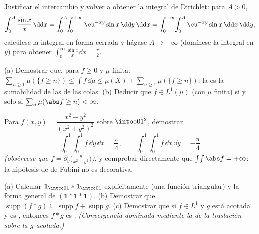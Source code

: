 \begin{exercise}[$\star$]\label{exo:b3:product:2}
Justificar el intercambio y volver a obtener la integral de Dirichlet:
para
$A > 0$,
\[
\int_0^A\frac{\sin x}x\,\dd x
= \int_0^A\!\!\int_0^{+\infty}\eu^{-xy}\sin x\,\dd y\,\dd x
= \int_0^{+\infty}\!\!\int_0^A \eu^{-xy}\sin x\,\dd x\,\dd y,
\]
calcúlese la integral  en forma cerrada y hágase $A \to
+\infty$ (domínese la integral en $y$) para obtener
$\int_0^\infty\frac{\sin x}x\dd x = \frac\pi2$.
\end{exercise}

\begin{exercise}[$\star\star$]\label{exo:b3:product:3}
(a) Demostrar que, para $f \geq 0$
 y $\mu$ finita:
$\sum_{n\geq1}\mu(\{f \geq n\}) \leq \int f\,\dd\mu \leq
\mu(X) + \sum_{n\geq1}\mu(\{f\geq n\})$: la
 es la sumabilidad de las
 de las colas. (b) Deducir que
$f \in L^1(\mu)$ (con $\mu$ finita) si y solo si
$\sum_n\mu(\abs f \geq n) < \infty$.
\end{exercise}

\begin{exercise}[$\star\star$]\label{exo:b3:product:4}
Para $f(x, y) = \dfrac{x^2 - y^2}{(x^2 + y^2)^2}$ sobre $\intoo01^2$,
demostrar
\[
\int_0^1\!\!\int_0^1 f\,\dd y\,\dd x = \frac\pi4,
\qquad
\int_0^1\!\!\int_0^1 f\,\dd x\,\dd y = -\frac\pi4
\]
\emph{(obsérvese que $f = \partial_y\bigl(\frac{y}{x^2+y^2}\bigr)$)}, y
comprobar directamente que $\int\!\int\abs f = +\infty$: la hipótesis de
 de Fubini no es decorativa.
\end{exercise}

\begin{exercise}[$\star\star$]\label{exo:b3:product:5}
(a) Calcular $\mathbf 1_{\intcc01} * \mathbf 1_{\intcc01}$
explícitamente (una función triangular) y la forma general de
$(\mathbf 1 * \mathbf 1 *
\mathbf 1)$. (b) Demostrar que $\operatorname{supp}(f * g) \subseteq
\overline{\operatorname{supp}f + \operatorname{supp}g}$. (c) Demostrar
que si $f \in L^1$ y $g$ está acotada y es
, entonces $f * g$ es
. \emph{(Convergencia
dominada mediante la  de
la traslación sobre la $g$ acotada.)}
\end{exercise}

